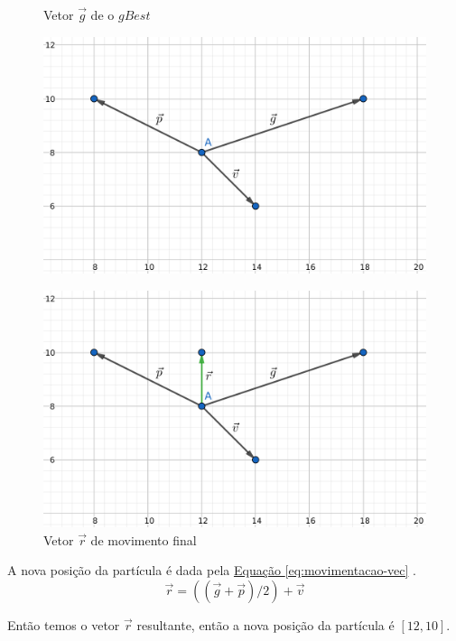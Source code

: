 \begin{figure}[!htb]
\begin{minipage}{\textwidth}
\begin{minipage}{0.48\textwidth}
\centering
\caption{Vetor $\vec g$ de o $gBest$}
\label{fig:vetor-g}
\includegraphics[width=.9\linewidth]{assets/vec3.png}
\end{minipage}
\begin{minipage}{0.48\textwidth}
\centering
\caption{Vetor $\vec r$ de movimento final}
\label{fig:vetor-r}
\includegraphics[width=.9\linewidth]{assets/vec4.png}
\end{minipage}

\end{minipage}
\end{figure}

\noindent A nova posição da partícula é dada pela 
\hyperref[eq:movimentacao-vec]{Equação \ref{eq:movimentacao-vec}}
.
%
\begin{equation} 
    \label{eq:movimentacao-vec}
    \vec r = ((\vec g + \vec p) / 2) + \vec v
\end{equation}

\noindent Então temos o vetor $\vec r$ resultante, então a nova posição da partícula é $[12,10]$.

